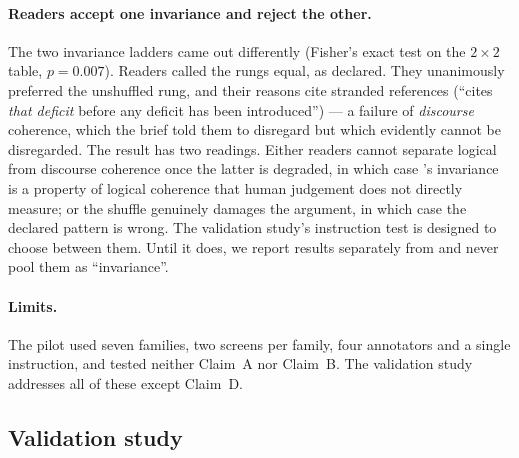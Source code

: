 \paragraph{Readers accept one invariance and reject the other.} The two invariance ladders came out differently
(Fisher's exact test on the $2\times2$ table, $p=0.007$). Readers called the  rungs equal, as
declared. They unanimously preferred the unshuffled  rung, and their reasons cite stranded references
(``cites \emph{that deficit} before any deficit has been introduced'') --- a failure of \emph{discourse}
coherence, which the brief told them to disregard but which evidently cannot be disregarded. The result has two
readings. Either readers cannot separate logical from discourse coherence once the latter is degraded, in which
case 's invariance is a property of logical coherence that human judgement does not directly
measure; or the shuffle genuinely damages the argument, in which case the declared pattern is wrong. The
validation study's instruction test is designed to choose between them. Until it does, we report 
results separately from  and never pool them as ``invariance''.

\paragraph{Limits.} The pilot used seven families, two screens per family, four annotators and a single
instruction, and tested neither Claim~A nor Claim~B. The validation study addresses all of these except Claim~D.

\subsection{Validation study}
\label{sec-study}

